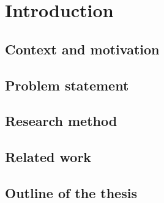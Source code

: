 \chapter{Introduction}
\section{Context and motivation}
\section{Problem statement}
\section{Research method}
\section{Related work}
\section{Outline of the thesis}
